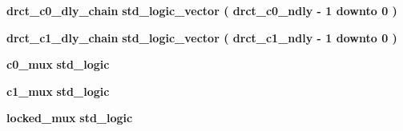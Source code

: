 \begin{DoxyCompactItemize}
\item 
{\bf drct\+\_\+c0\+\_\+dly\+\_\+chain} {\bfseries \textcolor{comment}{std\+\_\+logic\+\_\+vector}\textcolor{vhdlchar}{ }\textcolor{vhdlchar}{(}\textcolor{vhdlchar}{ }\textcolor{vhdlchar}{ }\textcolor{vhdlchar}{ }\textcolor{vhdlchar}{ }{\bfseries {\bf drct\+\_\+c0\+\_\+ndly}} \textcolor{vhdlchar}{-\/}\textcolor{vhdlchar}{ } \textcolor{vhdldigit}{1} \textcolor{vhdlchar}{ }\textcolor{keywordflow}{downto}\textcolor{vhdlchar}{ }\textcolor{vhdlchar}{ } \textcolor{vhdldigit}{0} \textcolor{vhdlchar}{ }\textcolor{vhdlchar}{)}\textcolor{vhdlchar}{ }} 
\item 
{\bf drct\+\_\+c1\+\_\+dly\+\_\+chain} {\bfseries \textcolor{comment}{std\+\_\+logic\+\_\+vector}\textcolor{vhdlchar}{ }\textcolor{vhdlchar}{(}\textcolor{vhdlchar}{ }\textcolor{vhdlchar}{ }\textcolor{vhdlchar}{ }\textcolor{vhdlchar}{ }{\bfseries {\bf drct\+\_\+c1\+\_\+ndly}} \textcolor{vhdlchar}{-\/}\textcolor{vhdlchar}{ } \textcolor{vhdldigit}{1} \textcolor{vhdlchar}{ }\textcolor{keywordflow}{downto}\textcolor{vhdlchar}{ }\textcolor{vhdlchar}{ } \textcolor{vhdldigit}{0} \textcolor{vhdlchar}{ }\textcolor{vhdlchar}{)}\textcolor{vhdlchar}{ }} 
\item 
{\bf c0\+\_\+mux} {\bfseries \textcolor{comment}{std\+\_\+logic}\textcolor{vhdlchar}{ }} 
\item 
{\bf c1\+\_\+mux} {\bfseries \textcolor{comment}{std\+\_\+logic}\textcolor{vhdlchar}{ }} 
\item 
{\bf locked\+\_\+mux} {\bfseries \textcolor{comment}{std\+\_\+logic}\textcolor{vhdlchar}{ }} 
\end{DoxyCompactItemize}
